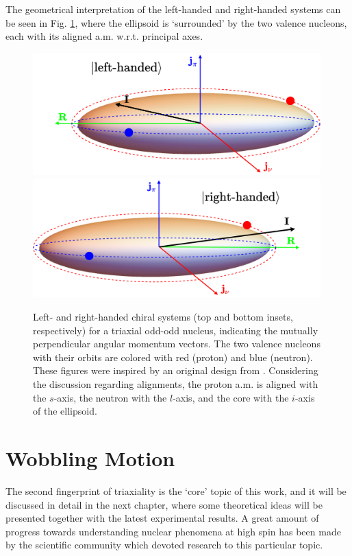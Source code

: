 The geometrical interpretation of the left-handed and right-handed systems can be seen in Fig. \ref{chiral-geometry}, where the ellipsoid is `surrounded' by the two valence nucleons, each with its aligned a.m. w.r.t. principal axes.

\begin{figure}
    \centering
    \includegraphics[width=0.99\textwidth]{Chapters/Figures/chiral_handedness-1.pdf}
    \includegraphics[width=0.99\textwidth]{Chapters/Figures/chiral_handedness-2.pdf}
    \caption{Left- and right-handed chiral systems (top and bottom insets, respectively) for a triaxial odd-odd nucleus, indicating the mutually perpendicular angular momentum vectors. The two valence nucleons with their orbits are colored with red (proton) and blue (neutron). These figures were inspired by an original design from \cite{starosta2001chiral}. Considering the discussion regarding alignments, the proton a.m. is aligned with the $s$-axis, the neutron with the $l$-axis, and the core with the $i$-axis of the ellipsoid.}
    \label{chiral-geometry}
\end{figure}

\section{Wobbling Motion}

The second fingerprint of triaxiality is the `core' topic of this work, and it will be discussed in detail in the next chapter, where some theoretical ideas will be presented together with the latest experimental results. A great amount of progress towards understanding nuclear phenomena at high spin has been made by the scientific community which devoted research to this particular topic.

